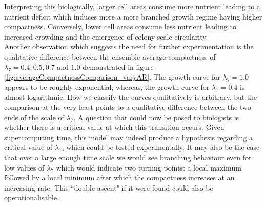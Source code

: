 Interpreting this biologically, larger cell areas consume more nutrient leading
to a nutrient deficit which induces more a more branched growth regime having higher 
compactness. Conversely, lower cell areas consume less nutrient leading 
to increased crowding and the emergence of colony scale circularity.
\\

Another observation which suggests the need for further experimentation is 
the qualitative difference between the ensemble average compactness of 
$\lambda_7 = 0.4, 0.5, 0.7$ and $1.0$ demonstrated in figure \ref{fig:averageCompactnessComparison_varyAR}.
The growth curve for $\lambda_7 = 1.0$ appears to be roughly exponential,
whereas, the growth curve for $\lambda_7 = 0.4$ is almost logarithmic.
How we classify the curves qualitatively is arbitrary,
but the comparison at the very least points to a qualitative 
difference between the two ends of the scale of $\lambda_7$. A question 
that could now be posed to biologists is whether there is a critical 
value at which this transition occurs. Given supercomputing 
time, this model may indeed produce a hypothesis regarding a critical value of $\lambda_7$,
which could be tested experimentally. It may also be the case that over a large enough 
time scale we would see branching behaviour even for low values of $\lambda_7$
which would indicate two turning points: a local maximum followed by a local minimum after which 
the compactness increases at an increasing rate. This ``double-ascent" if 
it were found could also be operationalisable.


